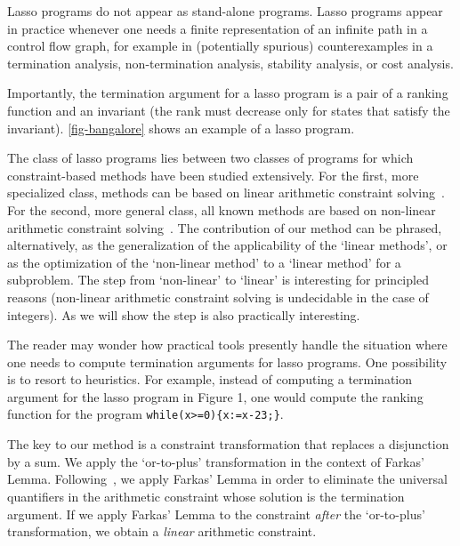 \documentclass[a4paper]{llncs}
\begin{document}
Lasso programs do not appear as stand-alone programs.
Lasso programs appear in practice whenever one needs a finite representation of an infinite path in a control flow graph, for example in (potentially spurious) counterexamples in a termination analysis\cite{cav/CookPR06,sas/HarrisLNR10,atva/KroeningSTTW08,cav/KroeningSTW10},  non-termination analysis\cite{conf/popl/GuptaHMRX08}, stability analysis\cite{vmcai/CookFKP11,hybrid/PodelskiW07}, or cost analysis\cite{DBLP:journals/jar/AlbertAGP11,conf/pldi/GulwaniZ10}.

Importantly, the termination argument for a lasso program is a pair of a ranking function and an invariant (the rank must decrease only for states that satisfy the invariant). \autoref{fig-bangalore} shows an example of a lasso program.

The class of lasso programs lies between two classes of programs for which constraint-based methods have been studied extensively. 
For the first, more specialized class, methods can be based on linear arithmetic constraint solving~\cite{DBLP:journals/iandc/BagnaraMPZ12,DBLP:journals/corr/abs-1208-4041,tacas/ColonS01,journals/fmsd/CookKRW13,vmcai/PodelskiR04}. 
For the second, more general class, all known methods are based on non-linear arithmetic constraint solving~\cite{cav/BradleyMS05,concur/BradleyMS05}. 
The contribution of our method can be phrased, alternatively, as the generalization of the applicability of the `linear methods', or as the
optimization of the `non-linear method' to a `linear method' for a subproblem.
The step from `non-linear' to `linear' is interesting for principled reasons (non-linear arithmetic constraint solving is undecidable in the case of integers).
As we will show the step is also practically interesting.

The reader may wonder how practical tools presently handle the situation where one needs to compute  termination arguments for lasso programs. 
One possibility is to resort to heuristics.
  For example, instead of computing a termination argument for the lasso program in Figure 1, one would compute the ranking function  for the program \verb|while(x>=0){x:=x-23;}|.

The key to our method is a constraint transformation that replaces a disjunction by a sum. We apply the `or-to-plus' transformation in the context of Farkas' Lemma.  
Following~\cite{DBLP:journals/iandc/BagnaraMPZ12,cav/BradleyMS05,tacas/ColonS01,journals/fmsd/CookKRW13,vmcai/PodelskiR04}, we apply Farkas' Lemma in order to eliminate the universal quantifiers in the arithmetic constraint whose solution is the termination argument.
If we apply Farkas' Lemma to the constraint \emph{after} the `or-to-plus' transformation, we obtain a \emph{linear} arithmetic constraint.
\end{document}
